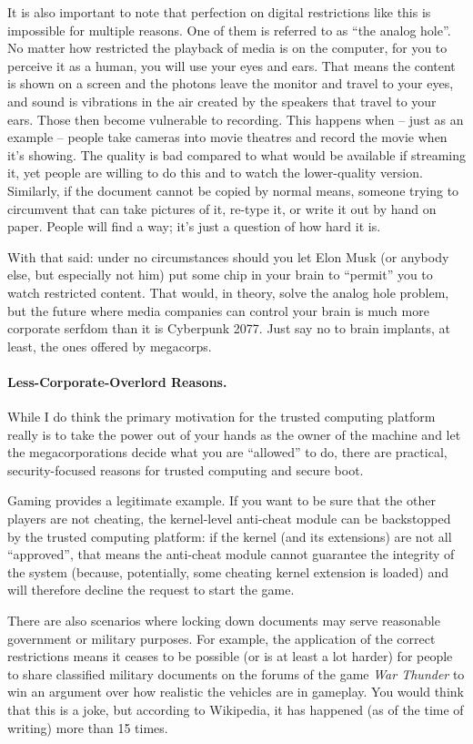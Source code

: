 It is also important to note that perfection on digital restrictions like this is impossible for multiple reasons. One of them is referred to as ``the analog hole''. No matter how restricted the playback of media is on the computer, for you to perceive it as a human, you will use your eyes and ears. That means the content is shown on a screen and the photons leave the monitor and travel to your eyes, and sound is vibrations in the air created by the speakers that travel to your ears. Those then become vulnerable to recording. This happens when -- just as an example -- people take cameras into movie theatres and record the movie when it's showing. The quality is bad compared to what would be available if streaming it, yet people are willing to do this and to watch the lower-quality version. Similarly, if the document cannot be copied by normal means, someone trying to circumvent that can take pictures of it, re-type it, or write it out by hand on paper. People will find a way; it's just a question of how hard it is. 

With that said: under no circumstances should you let Elon Musk (or anybody else, but especially not him) put some chip in your brain to ``permit'' you to watch restricted content. That would, in theory, solve the analog hole problem, but the future where media companies can control your brain is much more corporate serfdom than it is Cyberpunk 2077. Just say no to brain implants, at least, the ones offered by megacorps.

\paragraph{Less-Corporate-Overlord Reasons.} While I do think the primary motivation for the trusted computing platform really is to take the power out of your hands as the owner of the machine and let the megacorporations decide what you are ``allowed'' to do, there are practical, security-focused reasons for trusted computing and secure boot.

Gaming provides a legitimate example. If you want to be sure that the other players are not cheating, the kernel-level anti-cheat module can be backstopped by the trusted computing platform: if the kernel (and its extensions) are not all ``approved'', that means the anti-cheat module cannot guarantee the integrity of the system (because, potentially, some cheating kernel extension is loaded) and will therefore decline the request to start the game. 

There are also scenarios where locking down documents may serve reasonable government or military purposes. For example, the application of the correct restrictions means it ceases to be possible (or is at least a lot harder) for people to share classified military documents on the forums of the game \textit{War Thunder} to win an argument over how realistic the vehicles are in gameplay. You would think that this is a joke, but according to Wikipedia, it has happened (as of the time of writing) more than 15 times.

